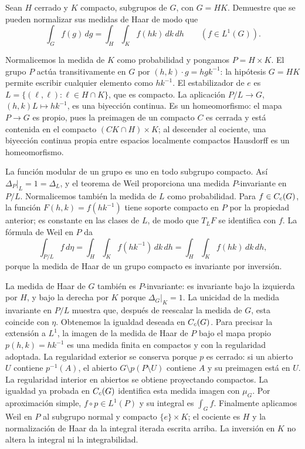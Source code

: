 \begin{ejercicio}\label{ej:v4-l21-3}
Sean $H$ cerrado y $K$ compacto, subgrupos de $G$, con $G=HK$. Demuestre que se pueden normalizar sus medidas de Haar de modo que
\[
 \int_Gf(g)\,dg=\int_H\int_K f(hk)\,dk\,dh
 \qquad(f\in L^1(G)).
\]
\end{ejercicio}
\begin{solucion}
Normalicemos la medida de $K$ como probabilidad y pongamos $P=H\times K$. El grupo $P$ actúa transitivamente en $G$ por $(h,k)\cdot g=hgk^{-1}$: la hipótesis $G=HK$ permite escribir cualquier elemento como $hk^{-1}$. El estabilizador de $e$ es
$L=\{(\ell,\ell):\ell\in H\cap K\}$, que es compacto. La aplicación $P/L\to G$, $(h,k)L\mapsto hk^{-1}$, es una biyección continua. Es un homeomorfismo: el mapa $P\to G$ es propio, pues la preimagen de un compacto $C$ es cerrada y está contenida en el compacto $(CK\cap H)\times K$; al descender al cociente, una biyección continua propia entre espacios localmente compactos Hausdorff es un homeomorfismo.

La función modular de un grupo es uno en todo subgrupo compacto. Así $\Delta_P|_L=1=\Delta_L$, y el teorema de Weil proporciona una medida $P$-invariante en $P/L$. Normalicemos también la medida de $L$ como probabilidad. Para $f\in C_c(G)$, la función $F(h,k)=f(hk^{-1})$ tiene soporte compacto en $P$ por la propiedad anterior; es constante en las clases de $L$, de modo que $T_LF$ se identifica con $f$. La fórmula de Weil en $P$ da
\[
 \int_{P/L}f\,d\eta=\int_H\int_K f(hk^{-1})\,dk\,dh
                  =\int_H\int_K f(hk)\,dk\,dh,
\]
porque la medida de Haar de un grupo compacto es invariante por inversión.

La medida de Haar de $G$ también es $P$-invariante: es invariante bajo la izquierda por $H$, y bajo la derecha por $K$ porque $\Delta_G|_K=1$. La unicidad de la medida invariante en $P/L$ muestra que, después de reescalar la medida de $G$, esta coincide con $\eta$. Obtenemos la igualdad deseada en $C_c(G)$. Para precisar la extensión a $L^1$, la imagen de la medida de Haar de $P$ bajo el mapa propio $p(h,k)=hk^{-1}$ es una medida finita en compactos y con la regularidad adoptada. La regularidad exterior se conserva porque $p$ es cerrado: si un abierto $U$ contiene $p^{-1}(A)$, el abierto $G\setminus p(P\setminus U)$ contiene $A$ y su preimagen está en $U$. La regularidad interior en abiertos se obtiene proyectando compactos. La igualdad ya probada en $C_c(G)$ identifica esta medida imagen con $\mu_G$. Por aproximación simple, $f\circ p\in L^1(P)$ y su integral es $\int_Gf$. Finalmente aplicamos Weil en $P$ al subgrupo normal y compacto $\{e\}\times K$; el cociente es $H$ y la normalización de Haar da la integral iterada escrita arriba. La inversión en $K$ no altera la integral ni la integrabilidad.
\end{solucion}

